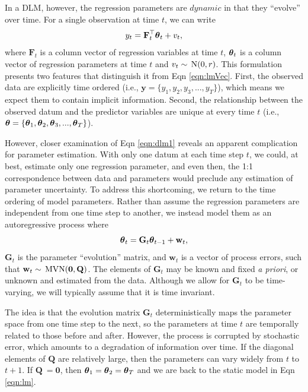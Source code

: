 \documentclass[10pt]{article}
\def\FF{\mbox{$\mathbf F$}}
\def\GG{\mbox{$\mathbf G$}}
\def\QQ{\mbox{$\mathbf Q$}}
\def\ww{\mbox{$\mathbf w$}}
\def\yy{\mbox{$\mathbf y$}}
\def\ttheta{\mbox{\boldmath $\theta$}}
\def\MVN{\,\textup{\textrm{MVN}}}
\def\N{\,\textup{\textrm{N}}}
\begin{document}
In a DLM, however, the regression parameters are $dynamic$ in that they ``evolve'' over time. For a single observation at time $t$, we can write
\begin{equation}\label{eqn:dlm1}
y_t = \FF_{t}^{\top}\ttheta_t + v_t,
\end{equation}
where $\FF_t$ is a column vector of regression variables at time $t$, $\ttheta_t$ is a column vector of regression parameters at time $t$ and $v_{t}\sim\N(0,r)$. This formulation presents two features that distinguish it from Eqn \ref{eqn:lmVec}. First, the observed data are explicitly time ordered (i.e., $\yy=\lbrace{y_1,y_2,y_3,...,y_T}\rbrace$), which means we expect them to contain implicit information. Second, the relationship between the observed datum and the predictor variables are unique at every time $t$ (i.e., $\ttheta=\lbrace{\ttheta_1,\ttheta_2,\ttheta_3,...,\ttheta_T}\rbrace$).

However, closer examination of Eqn \ref{eqn:dlm1} reveals an apparent complication for parameter estimation. With only one datum at each time step $t$, we could, at best, estimate only one regression parameter, and even then, the 1:1 correspondence between data and parameters would preclude any estimation of parameter uncertainty. To address this shortcoming, we return to the time ordering of model parameters. Rather than assume the regression parameters are independent from one time step to another, we instead model them as an autoregressive process where
\begin{equation}\label{eqn:dlm2}
\ttheta_t = \GG_t\ttheta_{t-1} + \ww_t,
\end{equation}
$\GG_t$ is the parameter ``evolution'' matrix, and $\ww_t$ is a vector of process errors, such that $\ww_t\sim\MVN(\mathbf{0},\QQ)$. The elements of $\GG_t$ may be known and fixed \textit{a priori}, or unknown and estimated from the data. Although we allow for $\GG_t$ to be time-varying, we will typically assume that it is time invariant.

The idea is that the evolution matrix $\GG_t$ deterministically maps the parameter space from one time step to the next, so the parameters at time $t$ are temporally related to those before and after. However, the process is corrupted by stochastic error, which amounts to a degradation of information over time. If the diagonal elements of $\QQ$ are relatively large, then the parameters can vary widely from $t$ to $t+1$. If $\QQ\ = \mathbf{0}$, then $\ttheta_1=\ttheta_2=\ttheta_T$ and we are back to the static model in Eqn \ref{eqn:lm}.
\end{document}
